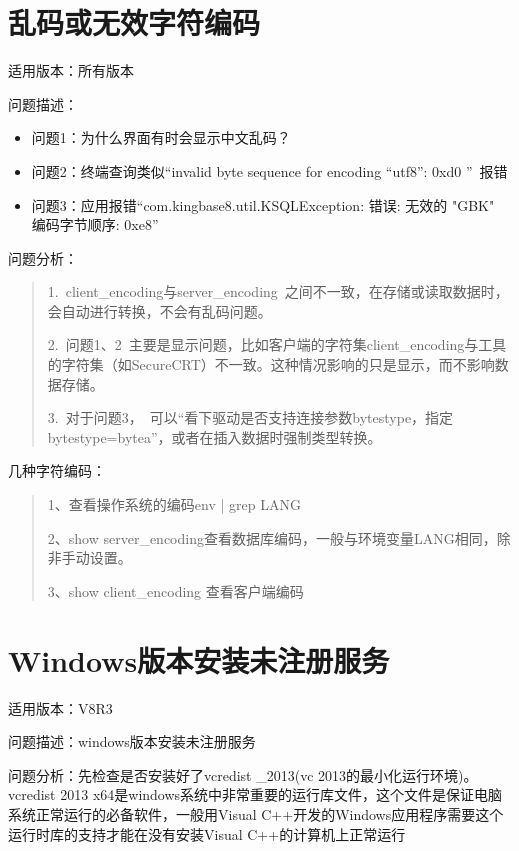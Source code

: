 \documentclass[letterpaper,10pt,english]{sphinxmanual}
\begin{document}
\section{乱码或无效字符编码}
\label{\detokenize{sql:id7}}
适用版本：所有版本

问题描述：
\begin{itemize}
\item {} 
问题1：为什么界面有时会显示中文乱码？

\item {} 
问题2：终端查询类似“invalid byte sequence for encoding “utf8”: 0xd0 ” 报错

\item {} 
问题3：应用报错“com.kingbase8.util.KSQLException: 错误: 无效的 "GBK" 编码字节顺序: 0xe8”

\end{itemize}

问题分析：
\begin{quote}

1. client\_encoding与server\_encoding 之间不一致，在存储或读取数据时，会自动进行转换，不会有乱码问题。

2. 问题1、2 主要是显示问题，比如客户端的字符集client\_encoding与工具的字符集（如SecureCRT）不一致。这种情况影响的只是显示，而不影响数据存储。

3. 对于问题3， 可以“看下驱动是否支持连接参数bytestype，指定bytestype=bytea”，或者在插入数据时强制类型转换。
\end{quote}

几种字符编码：
\begin{quote}

1、查看操作系统的编码env | grep LANG

2、show server\_encoding查看数据库编码，一般与环境变量LANG相同，除非手动设置。

3、show client\_encoding 查看客户端编码
\end{quote}


\section{Windows版本安装未注册服务}
\label{\detokenize{sql:windows}}
适用版本：V8R3

问题描述：windows版本安装未注册服务

问题分析：先检查是否安装好了vcredist \_2013(vc 2013的最小化运行环境)。vcredist 2013 x64是windows系统中非常重要的运行库文件，这个文件是保证电脑系统正常运行的必备软件，一般用Visual C++开发的Windows应用程序需要这个运行时库的支持才能在没有安装Visual C++的计算机上正常运行
\end{document}
